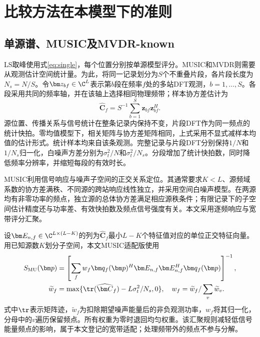\section{比较方法在本模型下的准则}\label{app:baselines}
\subsection{单源谱、MUSIC及MVDR-known}
LS取峰使用式\eqref{eq:single}，每个位置分别按单源模型评分。MUSIC和MVDR则需要从观测估计空间统计量。为此，将同一记录划分为$S$个不重叠片段，各片段长度为$N_s=N/S$。令$\bm z_{bf}\in\C^L$表示第$b$段在频率$f$处的多站DFT观测，$b=1,\ldots,S$。各段采用共同的频率轴，并在该轴上选择相同物理频带；样本协方差估计为
\begin{equation}
 \widehat{\bm C}_f=S^{-1}\sum_{b=1}^S\bm z_{bf}\bm z_{bf}^H .
\end{equation}
源位置、传播关系与信号统计在整条记录内保持不变，片段DFT作为同一频点的统计快拍。零均值模型下，相关矩阵与协方差矩阵相同，上式采用不显式减样本均值的估计形式。统计样本均来自该条观测。完整记录与片段DFT分别保持$1/N$和$1/N_s$归一化，白噪声方差分别为$\sigma_t^2/N$和$\sigma_t^2/N_s$。分段增加了统计快拍数，同时降低频率分辨率，并缩短每段的有效时长。

MUSIC利用信号响应与噪声子空间的正交关系定位\cite{WeissAmar2005}。其通常要求$K<L$、源频域系数的协方差满秩、不同源的跨站响应线性独立，并采用空间白噪声模型。在两源均有非零功率的频点，独立源的总体协方差满足相应源秩条件；有限记录下的子空间估计精度还与功率差、有效快拍数及频点信号强度有关。本文采用逐频响应与宽带评分汇聚。

设$\bm E_{n,f}\in\C^{L\times(L-K)}$的列为$\widehat{\bm C}_f$最小$L-K$个特征值对应的单位正交特征向量。用已知源数$K$划分子空间，本文MUSIC适配版使用
\begin{align}
 S_{\mathrm{MU}}(\bm p)&=\left[\sum_f w_f
 \bm q_f(\bm p)^H\bm E_{n,f}\bm E_{n,f}^H\bm q_f(\bm p)\right]^{-1},\label{eq:music}\\
 \widetilde w_f&=\max\{\tr(\widehat{\bm C}_f)-L\sigma_t^2/N_s,0\},\quad
 w_f=\widetilde w_f/\sum_v\widetilde w_v .\nonumber
\end{align}
式中$\tr$表示矩阵迹，$\widetilde w_f$为扣除期望噪声能量后的非负观测功率，$w_f$将其归一化，分母中的$v$遍历保留频点。所有权重为零时退回均匀权重。该汇聚规则减轻低信号能量频点的影响，属于本文登记的宽带适配；处理频带外的频点不参与分解。

